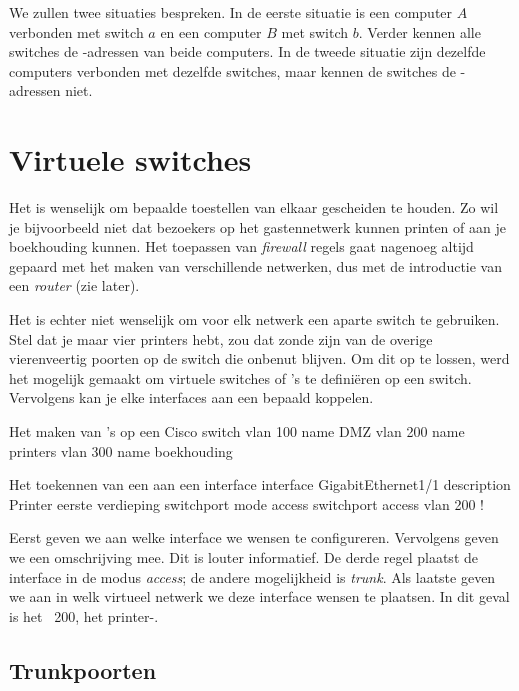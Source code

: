 We zullen twee situaties bespreken.
In de eerste situatie is een computer $A$ verbonden met switch $a$ en een computer $B$ met switch $b$.
Verder kennen alle switches de -adressen van beide computers.
In de tweede situatie zijn dezelfde computers verbonden met dezelfde switches, maar kennen de switches de -adressen niet.


\section{Virtuele switches}
\label{sec:vlan}
Het is wenselijk om bepaalde toestellen van elkaar gescheiden te houden.
Zo wil je bijvoorbeeld niet dat bezoekers op het gastennetwerk kunnen printen of aan je boekhouding kunnen.
Het toepassen van \emph{firewall} regels gaat nagenoeg altijd gepaard met het maken van verschillende netwerken, dus met de introductie van een \emph{router} (zie later).

Het is echter niet wenselijk om voor elk netwerk een aparte switch te gebruiken.
Stel dat je maar vier printers hebt, zou dat zonde zijn van de overige vierenveertig poorten op de switch die onbenut blijven.
Om dit op te lossen, werd het mogelijk gemaakt om virtuele switches of 's te definiëren op een switch.
Vervolgens kan je elke interfaces aan een bepaald  koppelen.

\begin{iosconfig}{Het maken van 's op een Cisco switch}
vlan 100
   name DMZ
vlan 200
   name printers
vlan 300
   name boekhouding
\end{iosconfig}

\begin{iosconfig}{Het toekennen van een  aan een interface}
interface GigabitEthernet1/1
   description Printer eerste verdieping
   switchport mode access
   switchport access vlan 200
!
\end{iosconfig}

Eerst geven we aan welke interface we wensen te configureren.
Vervolgens geven we een omschrijving mee.
Dit is louter informatief.
De derde regel plaatst de interface in de modus \emph{access}; de andere mogelijkheid is \emph{trunk}.
Als laatste geven we aan in welk virtueel netwerk we deze interface wensen te plaatsen.
In dit geval is het ~200, het printer-.

\subsection{Trunkpoorten}